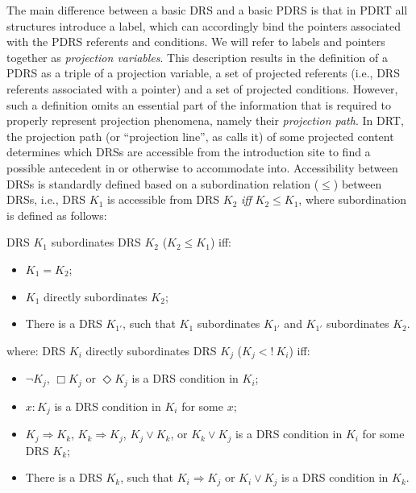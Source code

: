 The main difference between a basic DRS and a basic PDRS is that in PDRT all
structures introduce a label, which can accordingly bind the pointers
associated with the PDRS referents and conditions. We will refer to labels
and pointers together as \textit{projection variables}. This description
results in the definition of a PDRS as a triple of a projection variable,
a set of projected referents (i.e., DRS referents associated with a pointer)
and a set of projected conditions. However, such a definition omits an
essential part of the information that is required to properly represent
projection phenomena, namely their \emph{projection path}. In DRT, the
projection path (or ``projection line'', as
 calls it) of some projected content
determines which DRSs are accessible from the introduction site to find
a possible antecedent in or otherwise to accommodate into. Accessibility
between DRSs is standardly defined based on a subordination relation
($\leq$) between DRSs, i.e., DRS $K_1$ is accessible from DRS $K_2$
\textit{iff} $K_2\leq K_1$, where subordination is defined as follows:

\begin{definition}\label{def:DRSsub}
DRS $K_1$ subordinates DRS $K_2$ ($K_2 \leq K_1$) iff:
  \begin{itemize}
    \item $K_1 = K_2$;
    \item $K_1$ directly subordinates $K_2$;
    \item There is a DRS $K_{1'}$, such that $K_1$ subordinates $K_{1'}$ and 
      $K_{1'}$ subordinates $K_2$.
  \end{itemize}
  where: DRS $K_i$ directly subordinates DRS $K_j$ ($K_j <!~K_i$) iff:
  \begin{itemize}
    \item $\neg K_j$, $\Box K_j$ or $\Diamond K_j$ is a DRS condition in
      $K_i$;
    \item $x:K_j$ is a DRS condition in $K_i$ for some $x$;
    \item $K_j \Rightarrow K_k$, $K_k \Rightarrow K_j$, $K_j \vee K_k$, or 
      $K_k \vee K_j$ is a DRS condition in $K_i$ for some DRS $K_k$;
    \item There is a DRS $K_k$, such that $K_i \Rightarrow K_j$ or $K_i \vee K_j$
      is a DRS condition in $K_k$.
  \end{itemize}
\end{definition}

